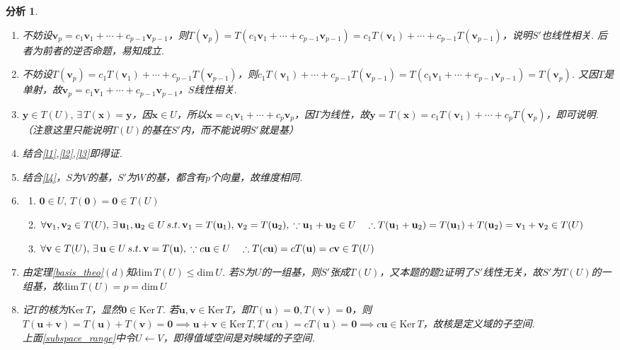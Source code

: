 \documentclass[11pt,UTF8]{ctexart}
\newtheorem*{analysis}{分析}
\def\vx{\mathbf{x}}
\def\vv{\mathbf{v}}
\def\vu{\mathbf{u}}
\def\dim{\mathrm{dim}\,}
\def\ker{\mathrm{Ker}\,}
\newcommand{\vb}[1]{\mathbf{#1}}
\begin{document}
\begin{analysis}
\begin{enumerate}
\itemsep-3pt
\item 不妨设$\vv_p=c_1\vv_1+\cdots+c_{p-1}\vv_{p-1}$，则$T(\vv_p)=T(c_1\vv_1+\cdots+c_{p-1}\vv_{p-1})=c_1T(\vv_1)+\cdots+c_{p-1}T(\vv_{p-1})$，说明$S'$也线性相关. 后者为前者的逆否命题，易知成立.
\item 不妨设$T(\vv_p)=c_1T(\vv_1)+\cdots+c_{p-1}T(\vv_{p-1})$，则$c_1T(\vv_1)+\cdots+c_{p-1}T(\vv_{p-1})=T(c_1\vv_1+\cdots+c_{p-1}\vv_{p-1})=T(\vv_p)$. 又因$T$是单射，故$\vv_p=c_1\vv_1+\cdots+c_{p-1}\vv_{p-1}$，$S$线性相关.
\item $\vb{y}\in T(U),\,\exists\,T(\vx)=\vb{y}$，因$\vx\in U$，所以$\vx=c_1\vv_1+\cdots+c_p\vv_p$，因$T$为线性，故$\vb{y}=T(\vx)=c_1T(\vb{v}_1)+\cdots+c_pT(\vb{v}_p)$，即可说明.（注意这里只能说明$T(U)$的基在$S'$内，而不能说明$S'$就是基）
\item 结合\ref{l1},\ref{l2},\ref{l3}即得证.
\item 结合\ref{l4}，$S$为$V$的基，$S'$为$W$的基，都含有$p$个向量，故维度相同.
\item \begin{enumerate}
	\itemsep -3pt
	\item $\vb{0}\in U,\,T(\vb{0})=\vb{0}\in T(U)$
	\item $\forall\vv_1,\vv_2\in T(U),\,\exists\,\vu_1,\vu_2\in U\,s.t.\,\vv_1=T(\vu_1),\,\vv_2=T(\vu_2),\\
	\because \vu_1+\vu_2\in U\quad\therefore T(\vu_1+\vu_2)=T(\vu_1)+T(\vu_2)=\vv_1+\vv_2 \in T(U)$
	\item $\forall\vv\in T(U),\,\exists\,\vu\in U\,s.t.\,\vv=T(\vu),\\
	\because c\vu\in U\quad\therefore T(c\vu)=cT(\vu)=c\vv\in T(U)$
\end{enumerate}
\item 由定理\ref{basis_theo}$(d)$知$\dim T(U)\leq\dim U$. 若$S$为$U$的一组基，则$S'$张成$T(U)$，又本题的题$2$证明了$S'$线性无关，故$S'$为$T(U)$的一组基，故$\dim T(U)=p=\dim U$
\item 记$T$的核为$\ker T$，显然$\vb{0}\in\ker T$. 若$\vu,\vv\in \ker T$，即$T(\vu)=\vb{0},T(\vv)=\vb{0}$，则$T(\vu+\vv)=T(\vu)+T(\vv)=\vb{0}\implies \vu+\vv\in \ker T,T(c\vu)=cT(\vu)=\vb{0}\implies c\vu\in\ker T$，故核是定义域的子空间.\\
上面\ref{subspace_range}中令$U\gets V$，即得值域空间是对映域的子空间.
\end{enumerate}
\end{analysis}
\end{document}
